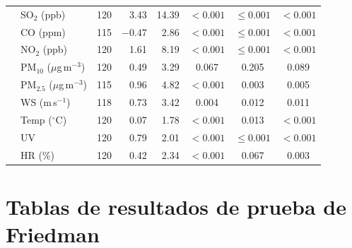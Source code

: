 \begin{longtable}{@{}llrrrccc@{}}
          & SO$_2$ (ppb)                     & 120 & 3.43 & 14.39 & $<0.001$ & $\leq0.001$ & $<0.001$ \\
          & CO (ppm)                         & 115 & $-0.47$ & 2.86 & $<0.001$ & $\leq0.001$ & $<0.001$ \\
          & NO$_2$ (ppb)                     & 120 & 1.61 & 8.19  & $<0.001$ & $\leq0.001$ & $<0.001$ \\
          & PM$_{10}$ ($\mu$g\,m$^{-3}$)     & 120 & 0.49 & 3.29  & 0.067    & 0.205       & 0.089 \\
          & PM$_{2.5}$ ($\mu$g\,m$^{-3}$)    & 115 & 0.96 & 4.82  & $<0.001$ & 0.003       & 0.005 \\
          & WS (m\,s$^{-1}$)                 & 118 & 0.73 & 3.42  & 0.004    & 0.012       & 0.011 \\
          & Temp ($^{\circ}$C)               & 120 & 0.07 & 1.78  & $<0.001$ & 0.013       & $<0.001$ \\
          & UV                               & 120 & 0.79 & 2.01  & $<0.001$ & $\leq0.001$ & $<0.001$ \\
          & HR (\%)                          & 120 & 0.42 & 2.34  & $<0.001$ & 0.067       & 0.003 \\
\end{longtable}

\chapter{Tablas de resultados de prueba de Friedman}
\label{anexo:fried}


